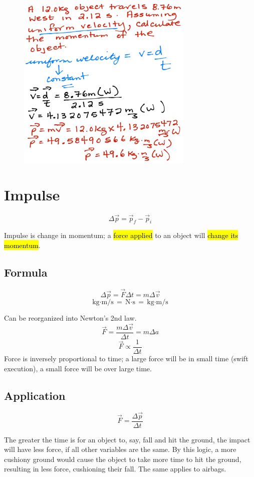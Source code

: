 \documentclass[a4paper,12pt]{article}
\begin{document}
\begin{figure}[H]
    \centering
    \includegraphics[width=0.75\textwidth]{q-mom-3}
\end{figure}

\section{Impulse}
\Large $$\Delta\vec{p} = \vec{p}_f - \vec{p}_i$$ \normalsize

Impulse is change in momentum; a \hl{force applied} to an object will \hl{change its momentum}.

\subsection{Formula}
\Large $$\Delta\vec{p} = \vec{F}\Delta{t} = m\Delta{\vec{v}}$$ \normalsize
$$\si{\kg\cdot\m\per\s} = \si{\newton\cdot\s} = \si{\kg\cdot\m\per\s}$$

Can be reorganized into Newton's 2nd law.
$$\vec{F} = \frac{m\Delta\vec{v}}{\Delta{t}} = m\Delta{a}$$
$$\vec{F} \propto \frac{1}{\Delta{t}}$$
Force is inversely proportional to time; a large force will be in small time (swift execution), a small force will be over large time.

\subsection{Application}
$$\vec{F} = \frac{\Delta\vec{p}}{\Delta{t}}$$

The greater the time is for an object to, say, fall and hit the ground, the impact will have less force, if all other variables are the same. By this logic, a more cushiony ground would cause the object to take more time to hit the ground, resulting in less force, cushioning their fall. The same applies to airbags.
\end{document}
